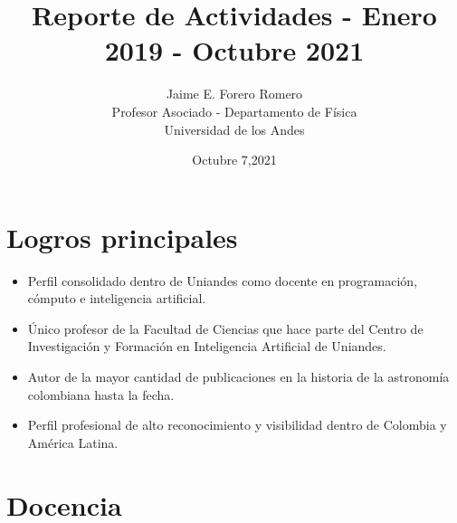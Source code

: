 \documentclass{article}
\title{Reporte de Actividades - Enero 2019 - Octubre 2021}
\author{Jaime E. Forero Romero\\Profesor Asociado - Departamento de
  F\'isica\\Universidad de los Andes}
\date{Octubre 7,2021}
\begin{document}
\maketitle
\tableofcontents
\newpage

\section*{Logros principales}
\begin{itemize}
\item Perfil consolidado dentro de Uniandes como docente en programaci\'on, c\'omputo e inteligencia artificial.

\item \'Unico profesor de la Facultad de Ciencias que hace parte del Centro de Investigaci\'on y Formaci\'on en Inteligencia Artificial de Uniandes.

\item Autor de la mayor cantidad de publicaciones en la historia de la astronom\'ia colombiana hasta la fecha. 

\item Perfil profesional de alto reconocimiento y visibilidad dentro de Colombia y Am\'erica Latina.



\end{itemize}

\section{Docencia}
\end{document}
